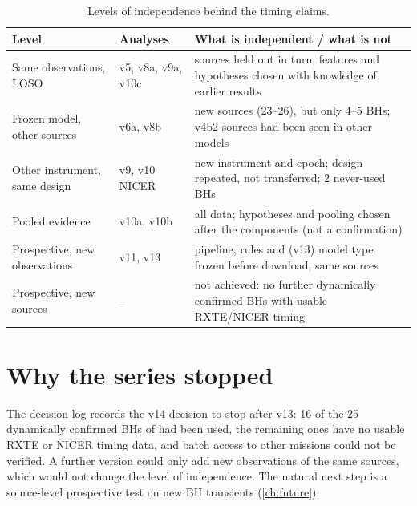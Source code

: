 \begin{table}[htbp]
\centering\small
\caption[Independence ladder]{Levels of independence behind the timing claims.}
\label{tab:synthladder}
\begin{tabularx}{\textwidth}{@{}p{3.6cm}>{\raggedright\arraybackslash}X>{\raggedright\arraybackslash}p{4.2cm}@{}}
\toprule
Level & Analyses & What is independent / what is not \\
\midrule
Same observations, LOSO & v5, v8a, v9a, v10c & sources held out in turn; features and hypotheses chosen with knowledge of earlier results \\
Frozen model, other sources & v6a, v8b & new sources (23--26), but only 4--5 BHs; v4b2 sources had been seen in other models \\
Other instrument, same design & v9, v10 NICER & new instrument and epoch; design repeated, not transferred; 2 never-used BHs \\
Pooled evidence & v10a, v10b & all data; hypotheses and pooling chosen after the components (not a confirmation) \\
Prospective, new observations & v11, v13 & pipeline, rules and (v13) model type frozen before download; same sources \\
Prospective, new sources & -- & not achieved: no further dynamically confirmed BHs with usable RXTE/NICER timing \\
\bottomrule
\end{tabularx}
\end{table}

\section{Why the series stopped}\label{sec:synthstop}
The decision log records the v14 decision to stop after v13: 16 of the 25 dynamically confirmed BHs of \citet{Marcel2026} had been used,
the remaining ones have no usable RXTE or NICER timing data, and batch access to other missions could not be verified. A further version
could only add new observations of the same sources, which would not change the level of independence. The natural next step is a
source-level prospective test on new BH transients (\cref{ch:future}).
